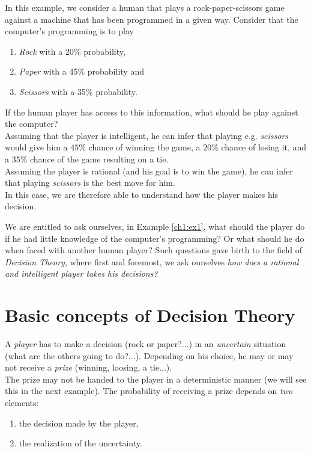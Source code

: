 \begin{example}
\label{ch1:ex1}
In this example, we consider a human that plays a rock-paper-scissors game against a machine that has been programmed in a given way.
Consider that the computer's programming is to play
\begin{enumerate}
\item \emph{Rock} with a 20\% probability,
\item \emph{Paper} with a 45\% probability and
\item \emph{Scissors} with a 35\% probability.
\end{enumerate}
If the human player has access to this information, what should he play against the computer?\\
Assuming that the player is intelligent, he can infer that playing e.g. \emph{scissors} would give him a $45\%$ chance of winning the game, a $20\%$ chance of losing it, and a $35\%$ chance of the game resulting on a tie.\\
Assuming the player is rational (and his goal is to win the game), he can infer that playing \emph{scissors} is the best move for him. \\
In this case, we are therefore able to understand how the player makes his decision.
\end{example}

We are entitled to ask ourselves, in Example \ref{ch1:ex1}, what should the player do if he had little knowledge of the computer's programming? Or what should he do when faced with another human player? Such questions gave birth to the field of \emph{Decision Theory}, where first and foremost, we ask ourselves \emph{how does a rational and intelligent player takes his decisions?}





\section{Basic concepts of Decision Theory}


A \emph{player} has to make a decision (rock or paper?...) in an \emph{uncertain} situation (what are the others going to do?...). Depending on his choice, he may or may not receive a  \emph{prize} (winning, loosing, a tie...). \\
The prize may not be handed to the player in a deterministic manner (we will see this in the next example). The probability of receiving a prize depends on \emph{two} elements:
\begin{enumerate}
\item the decision made by the player,
\item the realization of the uncertainty.
\end{enumerate}

